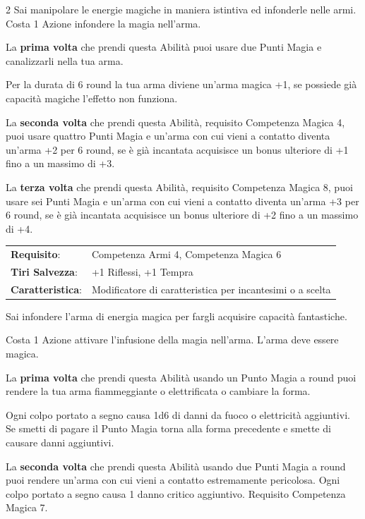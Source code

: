 \begin{multicols}{2}
Sai manipolare le energie magiche in maniera istintiva ed infonderle nelle armi. Costa 1 Azione infondere la magia nell'arma.

La \textbf{prima volta} che prendi questa Abilità puoi usare due Punti Magia e canalizzarli nella tua arma.

Per la durata di 6 round la tua arma diviene un'arma magica +1, se possiede già capacità magiche l'effetto non funziona.

La \textbf{seconda volta} che prendi questa Abilità, requisito Competenza Magica 4, puoi usare quattro Punti Magia e un'arma con cui vieni a contatto diventa un'arma +2 per 6 round, se è già incantata acquisisce un bonus ulteriore di +1 fino a un massimo di +3.

La \textbf{terza volta} che prendi questa Abilità, requisito Competenza Magica 8, puoi usare sei Punti Magia e un'arma con cui vieni a contatto diventa un'arma +3 per 6 round, se è già incantata acquisisce un bonus ulteriore di +2 fino a un massimo di +4.

\hspace{-0.2cm}\begin{tabularx}{\linewidth}{l@{\hspace{8pt}}X}
\rowcolor{gray!20}\textbf{Requisito}: & Competenza Armi 4, Competenza Magica 6\\
\textbf{Tiri Salvezza}: & +1 Riflessi, +1 Tempra\\
\rowcolor{gray!20}\textbf{Caratteristica}: & Modificatore di caratteristica per incantesimi o a scelta\\
\end{tabularx}\smallskip

Sai infondere l'arma di energia magica per fargli acquisire capacità fantastiche.

Costa 1 Azione attivare l'infusione della magia nell'arma. L'arma deve essere magica.

La \textbf{prima volta} che prendi questa Abilità usando un Punto Magia a round puoi rendere la tua arma fiammeggiante o elettrificata o cambiare la forma.

Ogni colpo portato a segno causa 1d6 di danni da fuoco o elettricità aggiuntivi. Se smetti di pagare il Punto Magia torna alla forma precedente e smette di causare danni aggiuntivi.

La \textbf{seconda volta} che prendi questa Abilità usando due Punti Magia a round puoi rendere un'arma con cui vieni a contatto estremamente pericolosa. Ogni colpo portato a segno causa 1 danno critico aggiuntivo. Requisito Competenza Magica 7.


\end{multicols}
